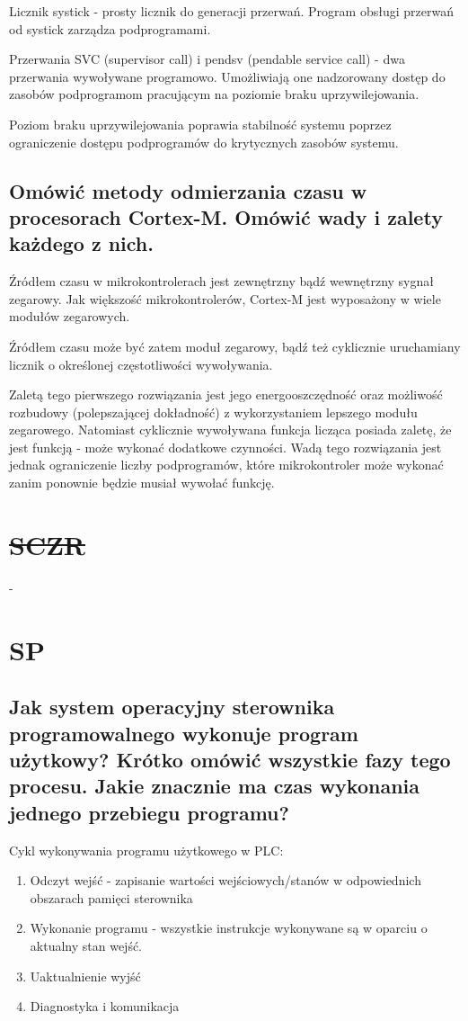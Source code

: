 Licznik systick - prosty licznik do generacji przerwań. Program obsługi przerwań od systick zarządza podprogramami.

Przerwania SVC (supervisor call) i pendsv (pendable service call) - dwa przerwania wywoływane programowo. Umożliwiają one nadzorowany dostęp do zasobów podprogramom pracującym na poziomie braku uprzywilejowania.

Poziom braku uprzywilejowania poprawia stabilność systemu poprzez ograniczenie dostępu podprogramów do krytycznych zasobów systemu.

\subsection{Omówić metody odmierzania czasu w procesorach Cortex-M. Omówić wady i zalety każdego z nich.}
Źródłem czasu w mikrokontrolerach jest zewnętrzny bądź wewnętrzny sygnał zegarowy. Jak większość mikrokontrolerów, Cortex-M jest wyposażony w wiele modułów zegarowych.

Źródłem czasu może być zatem moduł zegarowy, bądź też cyklicznie uruchamiany licznik o określonej częstotliwości wywoływania.

Zaletą tego pierwszego rozwiązania jest jego energooszczędność oraz możliwość rozbudowy (polepszającej dokładność) z wykorzystaniem lepszego modułu zegarowego. Natomiast cyklicznie wywoływana funkcja licząca posiada zaletę, że jest funkcją - może wykonać dodatkowe czynności. Wadą tego rozwiązania jest jednak ograniczenie liczby podprogramów, które mikrokontroler może wykonać zanim ponownie będzie musiał wywołać funkcję.

\section{\sout{SCZR}}
-

\section{SP}
\subsection{Jak system operacyjny sterownika programowalnego wykonuje program użytkowy? Krótko omówić wszystkie fazy tego procesu. Jakie znacznie ma czas wykonania jednego przebiegu programu?}
Cykl wykonywania programu użytkowego w PLC:
\begin{enumerate}
    \item Odczyt wejść - zapisanie wartości wejściowych/stanów w odpowiednich obszarach pamięci sterownika
    \item Wykonanie programu - wszystkie instrukcje wykonywane są w oparciu o aktualny stan wejść.
    \item Uaktualnienie wyjść
    \item Diagnostyka i komunikacja
\end{enumerate}


